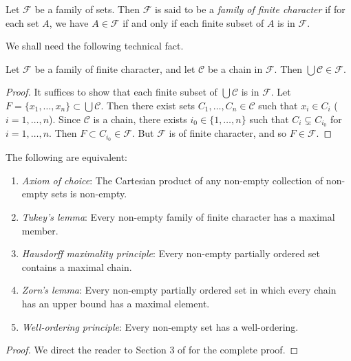 \begin{definition}
Let $\mathscr{F}$ be a family of sets. Then $\mathscr{F}$ is said to be a \emph{family of finite character} if for each set $A$, we have $A\in\mathscr{F}$ if and only if each finite subset of $A$ is in $\mathscr{F}$.
\end{definition}

We shall need the following technical fact.

\begin{lemma}
Let $\mathscr{F}$ be a family of finite character, and let $\mathscr{C}$ be a chain in $\mathscr{F}$. Then $\bigcup\mathscr{C}\in\mathscr{F}$.
\end{lemma}

\begin{proof}
It suffices to show that each finite subset of $\bigcup\mathscr{C}$ is in $\mathscr{F}$. Let $F=\{x_1,\dots,x_n\}\subset\bigcup\mathscr{C}$. Then there exist sets $C_1,\dots,C_n\in\mathscr{C}$ such that $x_i\in C_i$ ($i=1,\dots,n$). Since $\mathscr{C}$ is a chain, there exists $i_0\in\{1,\dots,n\}$ such that $C_i\subsetneq C_{i_0}$ for $i=1,\dots,n$. Then $F\subset C_{i_0}\in\mathscr{F}$. But $\mathscr{F}$ is of finite character, and so $F\in\mathscr{F}$.
\end{proof}

\begin{theorem}
The following are equivalent:
\begin{enumerate}[label=(\roman*)]
\item \emph{Axiom of choice}: The Cartesian product of any non-empty collection of non-empty sets is non-empty.
\item \emph{Tukey's lemma}: Every non-empty family of finite character has a maximal member.
\item \emph{Hausdorff maximality principle}: Every non-empty partially ordered set contains a maximal chain.
\item \emph{Zorn's lemma}: Every non-empty partially ordered set in which every chain has an upper bound has a maximal element.
\item \emph{Well-ordering principle}: Every non-empty set has a well-ordering.
\end{enumerate}
\end{theorem}

\begin{proof}
We direct the reader to Section 3 of \cite{hewitt-stromberg} for the complete proof.
\end{proof}

